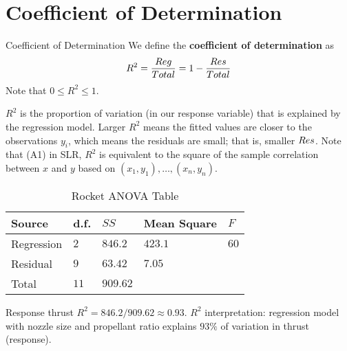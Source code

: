 \section{Coefficient of Determination}
\begin{Definition}{Coefficient of Determination}{}
    We define the \textbf{coefficient of determination} as
    \[ R^2 = \frac{\relax{Reg}}{\relax{Total}} =1-\frac{\relax{Res}}{\relax{Total}} \]
    Note that $ 0\leqslant R^2\leqslant 1 $.
\end{Definition}
$ R^2 $ is the proportion of variation (in our response variable)
that is explained by the regression model. Larger $ R^2 $ means
the fitted values are closer to the observations $ y_i $,
which means the residuals are small; that is, smaller $ \relax{Res} $.
Note that (A1) in SLR, $ R^2 $ is equivalent to the square of
the sample correlation between $ x $ and $ y $
based on $ (x_1,y_1),\ldots,(x_n,y_n) $.

\begin{table}[H]
    \centering
    \caption{Rocket ANOVA Table}
    \begin{tabularx}{\linewidth}{@{}YYYYY@{}}
        \toprule
        Source     & d.f.   & $ SS $     & Mean Square & $ F $  \\
        \midrule
        Regression & $ 2 $  & $ 846.2 $  & $ 423.1 $   & $ 60 $ \\
        Residual   & $ 9 $  & $ 63.42 $  & $ 7.05 $    &        \\
        \midrule
        Total      & $ 11 $ & $ 909.62 $                        \\
        \bottomrule
    \end{tabularx}
\end{table}
Response thrust
$ R^2=846.2/909.62 \approx 0.93 $. $ R^2 $
interpretation: regression model with nozzle size and propellant ratio
explains $ 93\% $ of variation in thrust (response).
